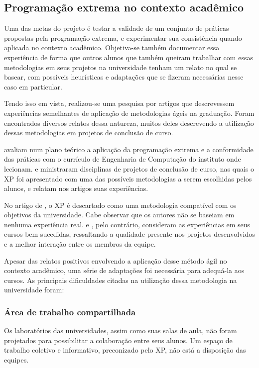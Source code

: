 	\subsection{Programação extrema no contexto acadêmico}\label{xp_e_universidade}
    Uma das metas do projeto é testar a validade de um conjunto de práticas propostas pela programação extrema, e experimentar sua consistência quando aplicada no contexto acadêmico. Objetiva-se também documentar essa experiência de forma que outros alunos que também queiram trabalhar com essas metodologias em seus projetos na universidade tenham um relato no qual se basear, com possíveis heurísticas e adaptações que se fizeram necessárias nesse caso em particular.

    Tendo isso em vista, realizou-se uma pesquisa por artigos que descrevessem experiências semelhantes de aplicação de metodologias ágeis na graduação. Foram encontrados diversos relatos dessa natureza, muitos deles descrevendo a utilização dessas metodologias em projetos de conclusão de curso.

     avaliam num plano teórico a aplicação da programação extrema e a conformidade das práticas com o currículo de Engenharia de Computação do instituto onde lecionam.  e  ministraram disciplinas de projetos de conclusão de curso, nas quais o XP foi apresentado com uma das possíveis metodologias a serem escolhidas pelos alunos, e relatam nos artigos suas experiências.

    No artigo de , o XP é descartado como uma metodologia compatível com os objetivos da universidade. Cabe observar que os autores não se baseiam em nenhuma experiência real.  e , pelo contrário, consideram as experiências em seus cursos bem sucedidas, ressaltando a qualidade presente nos projetos desenvolvidos e a melhor interação entre os membros da equipe.

    Apesar das relatos positivos envolvendo a aplicação desse método ágil no contexto acadêmico, uma série de adaptações foi necessária para adequá-la aos cursos. As principais dificuldades citadas na utilização dessa metodologia na universidade foram:

    \subsubsection{Área de trabalho compartilhada}
      Os laboratórios das universidades, assim como suas salas de aula, não foram projetados para possibilitar a colaboração entre seus alunos. Um espaço de trabalho coletivo e informativo, preconizado pelo XP, não está a disposição das equipes.

